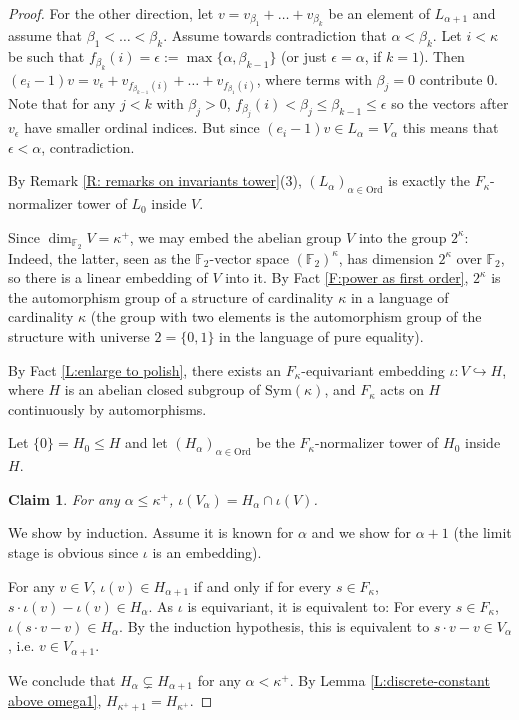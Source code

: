 \documentclass[10pt,a4paper]{amsart}
\theoremstyle{plain}
\newtheorem{claim}[theorem]{Claim}
\theoremstyle{definition}
\newenvironment{claimproof}[1][\proofname]
  {\proof[#1]\renewcommand*\qedsymbol{$\square$ (claim)}}
  {\endproof}
\newcommand{\FF}{\mathbb{F}}
\begin{document}
\begin{proof}
\begin{claimproof}
        For the other direction, let $v=v_{\beta_1}+\dots+v_{\beta_k}$ be an element of $L_{\alpha+1}$ and assume that $\beta_1<\dots<\beta_k$. Assume towards contradiction that $\alpha <\beta_{k}$. Let $i<\kappa$ be such that $f_{\beta_k}(i) =\epsilon := \max\{\alpha,\beta_{k-1}\}$ (or just $\epsilon=\alpha$, if $k=1$). Then $(e_i-1) v = v_{\epsilon}+v_{f_{\beta_{k-1}}(i)} +\ldots +v_{f_{\beta_1}(i)}$, where terms with $\beta_j=0$ contribute $0$. Note that for any $j<k$ with $\beta_j>0$, $f_{\beta_j}(i)<\beta_j\leq \beta_{k-1}\leq \epsilon$ so the vectors after $v_{\epsilon}$ have smaller ordinal indices. But since $(e_i -1)v \in L_{\alpha} = V_{\alpha}$ this means that $\epsilon < \alpha$, contradiction.
      
    \end{claimproof}


    By Remark \ref{R: remarks on invariants tower}(3), $(L_\alpha)_{\alpha\in \mathrm{Ord}}$ is exactly the $F_\kappa$-normalizer tower of $L_0$ inside $V$. 
    
    Since $\dim_{\FF_2}V=\kappa^+$, we may embed the abelian group $V$ into the group $2^\kappa$: Indeed, the latter, seen as the $\FF_2$-vector space $(\FF_2)^\kappa$, has dimension $2^{\kappa}$ over $\FF_2$, so there is a linear embedding of $V$ into it. By Fact \ref{F:power as first order},  $2^\kappa$ is the automorphism group of a structure of cardinality $\kappa$ in a language of cardinality $\kappa$ (the group with two elements is the automorphism group of the structure with universe $2=\{0,1\}$ in the language of pure equality).
    
    By Fact \ref{L:enlarge to polish}, there exists an $F_\kappa$-equivariant embedding $\iota:V\hookrightarrow  H$, where $H$ is  an abelian closed subgroup of $\mathrm{Sym}(\kappa)$, and $F_\kappa$ acts on $H$ continuously by automorphisms.

    Let $\{0\}=H_0\leq H$ and let $(H_{\alpha})_{\alpha\in \mathrm{Ord}}$ be the  $F_\kappa$-normalizer tower  of $H_0$ inside $H$.
    
    \begin{claim}
        For any $\alpha\leq \kappa^+$, $\iota(V_\alpha)=H_\alpha\cap \iota(V)$.
    \end{claim}
    \begin{claimproof}
        We show by induction. Assume it is known for $\alpha$ and we show for $\alpha+1$ (the limit stage is obvious since $\iota$ is an embedding).

        For any $v\in V$, $\iota(v)\in H_{\alpha+1}$ if and only if for every $s\in F_\kappa$, $s\cdot \iota(v)-\iota(v)\in H_\alpha$. As $\iota$ is equivariant, it is equivalent to: For every $s\in F_\kappa$, $\iota(s\cdot v-v)\in H_\alpha$. By the induction hypothesis, this is equivalent to $s\cdot v-v\in V_\alpha$, i.e. $v\in V_{\alpha+1}$.
    \end{claimproof}

    We conclude that $H_{\alpha}\subsetneq H_{\alpha+1}$ for any $\alpha<\kappa^+$. By Lemma \ref{L:discrete-constant above omega1}, $H_{\kappa^++1}=H_{\kappa^+}$.
\end{proof}
\end{document}
